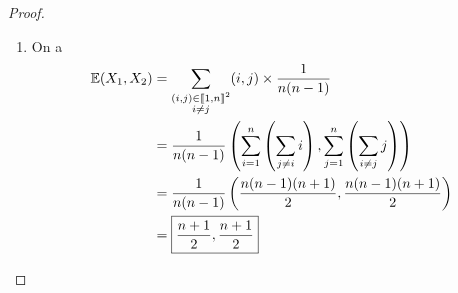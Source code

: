 \begin{proof}
\begin{enumerate}
        \item On a 
        \begin{align}
            \mathbb{E}(X_{1},X_{2})
            &=\sum_{\substack{(i,j)\in\llbracket1,n\rrbracket^{2}\\ i\neq j}}(i,j)\times\frac{1}{n(n-1)}\\
            &=\frac{1}{n(n-1)}\left(\sum_{i=1}^{n}\left(\sum_{j\neq i}i\right),\sum_{j=1}^{n}\left(\sum_{i\neq j}j\right)\right)\\
            &=\frac{1}{n(n-1)}\left(\frac{n(n-1)(n+1)}{2},\frac{n(n-1)(n+1)}{2}\right)\\
            &=\boxed{\frac{n+1}{2},\frac{n+1}{2}}
        \end{align}
    \end{enumerate}
\end{proof}